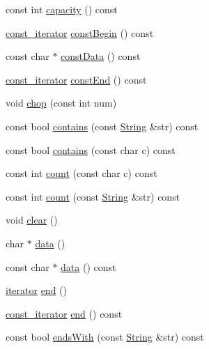 \begin{DoxyCompactItemize}
\item 
const int \hyperlink{classprism_1_1_string_a79a0e1b2a185376d36935ff637ba5678}{capacity} () const 
\item 
\hyperlink{classprism_1_1_string_a8b46f0fbe9c5c94ba892975242e3ab68}{const\+\_\+iterator} \hyperlink{classprism_1_1_string_a1c06ffe23cc1c0d552a2f5a32e40ba89}{const\+Begin} () const 
\item 
const char $\ast$ \hyperlink{classprism_1_1_string_ac336a0e353c9e8f27c9867171d70dd5d}{const\+Data} () const 
\item 
\hyperlink{classprism_1_1_string_a8b46f0fbe9c5c94ba892975242e3ab68}{const\+\_\+iterator} \hyperlink{classprism_1_1_string_a650b471cb36e6918361136895abef8bb}{const\+End} () const 
\item 
void \hyperlink{classprism_1_1_string_a6a0006f4412961eab5625d6366f60137}{chop} (const int num)
\item 
const bool \hyperlink{classprism_1_1_string_a6c449b65e60b931cbb9c951e442f1153}{contains} (const \hyperlink{classprism_1_1_string}{String} \&str) const 
\item 
const bool \hyperlink{classprism_1_1_string_ade50c4d728c1d7dfce7713a9c48e4033}{contains} (const char c) const 
\item 
const int \hyperlink{classprism_1_1_string_adde5ee34a762ec89df4354f562cb4c39}{count} (const char c) const 
\item 
const int \hyperlink{classprism_1_1_string_a415e31917ffe8a153aa761ba702ee34f}{count} (const \hyperlink{classprism_1_1_string}{String} \&str) const 
\item 
void \hyperlink{classprism_1_1_string_adcfa3f36badcb9e84c2c956a6b29c865}{clear} ()
\item 
char $\ast$ \hyperlink{classprism_1_1_string_aa70973a523fcfbaa608645085f004d29}{data} ()
\item 
const char $\ast$ \hyperlink{classprism_1_1_string_a8f28ba12d030e7f28fe533901dad97ea}{data} () const 
\item 
\hyperlink{classprism_1_1_string_adacc7975837e5fff95d70690777fb330}{iterator} \hyperlink{classprism_1_1_string_a66cac7d74458715877d381c036bd1698}{end} ()
\item 
\hyperlink{classprism_1_1_string_a8b46f0fbe9c5c94ba892975242e3ab68}{const\+\_\+iterator} \hyperlink{classprism_1_1_string_ada5833ed658db9ed7cd0d847b727b1c3}{end} () const 
\item 
const bool \hyperlink{classprism_1_1_string_a3cfa97542dcbb79a4db5715dcde850a5}{ends\+With} (const \hyperlink{classprism_1_1_string}{String} \&str) const 

\end{DoxyCompactItemize}

